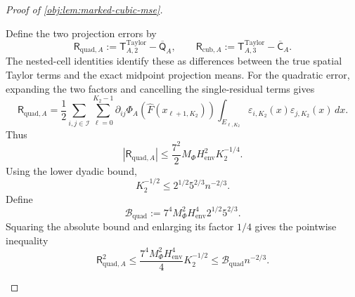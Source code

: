 \documentclass[11pt]{article}
\begin{document}
\begin{proof}[Proof of \cref{obj:lem:marked-cubic-mse}]
\begin{enumerate}
Define the two projection errors by
\[
\mathsf R_{\mathrm{quad},A}
:=\mathsf T^{\mathrm{Taylor}}_{A,2}
-\overline{\mathsf Q}_A,
\qquad
\mathsf R_{\mathrm{cub},A}
:=\mathsf T^{\mathrm{Taylor}}_{A,3}
-\overline{\mathsf C}_A.
\]
The nested-cell identities identify these as differences between the true spatial Taylor terms and the exact midpoint projection means. For the quadratic error, expanding the two factors and cancelling the single-residual terms gives
\[
\mathsf R_{\mathrm{quad},A}
=
\frac12\sum_{i,j\in\mathcal I}\sum_{\ell=0}^{K_2-1}
\partial_{ij}\Phi_A(\widehat F(x_{\ell+1,K_2}))
\int_{E_{\ell,K_2}}
\varepsilon_{i,K_2}(x)\varepsilon_{j,K_2}(x)\,dx.
\]
Thus
\[
|\mathsf R_{\mathrm{quad},A}|
\le\frac{7^2}{2}M_\Phi H_{\mathrm{env}}^2K_2^{-1/4}.
\]
Using the lower dyadic bound,
\[
K_2^{-1/2}
\le2^{1/2}5^{2/3}n^{-2/3}.
\]
Define
\[
\mathcal B_{\mathrm{quad}}
:=7^4M_\Phi^2H_{\mathrm{env}}^4
2^{1/2}5^{2/3}.
\]
Squaring the absolute bound and enlarging its factor \(1/4\) gives the pointwise inequality
\[
\mathsf R_{\mathrm{quad},A}^2
\le\frac{7^4M_\Phi^2H_{\mathrm{env}}^4}{4}K_2^{-1/2}
\le\mathcal B_{\mathrm{quad}}n^{-2/3}.
\]


\end{enumerate}
\end{proof}
\end{document}

